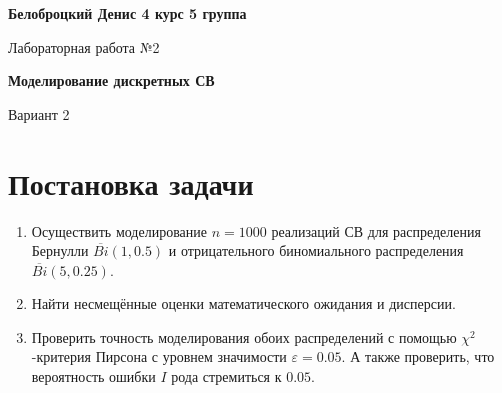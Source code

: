 \documentclass[12pt]{article}
\begin{document}
\textbf{Белоброцкий Денис 4 курс 5 группа}
\\
\begin{center}
	{\Large Лабораторная работа №2}
\end{center} 
\begin{center}
	{\large \textbf{Моделирование дискретных СВ}}
\end{center} 
\begin{center}
	Вариант 2
\end{center}

	\section*{Постановка задачи}
	\begin{enumerate}
	\item
	Осуществить моделирование $ n = 1000 $ реализаций СВ для распределения Бернулли $ \overline{Bi}\left(1, 0.5\right) $ и отрицательного биномиального распределения $ \overline{Bi}\left(5, 0.25\right) $. 
	\item	
	Найти несмещённые оценки математического ожидания и дисперсии.
	\item	
	Проверить точность моделирования обоих распределений с помощью $ \chi^2 $-критерия Пирсона с уровнем значимости $ \varepsilon = 0.05 $. А также проверить, что вероятность ошибки $ I $ рода стремиться к $ 0.05 $.
	\end{enumerate}
\end{document}

